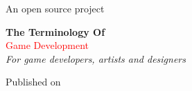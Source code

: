 \begin{titlepage} %

	\raggedleft %
	
	\vspace*{\baselineskip} %
	
	
	{\Large An open source project}
	
	\vspace*{0.167\textheight} %
	
	
	\textbf{\LARGE The Terminology Of}\\[\baselineskip]
	
	{\textcolor{Red}{\Huge Game Development}}\\[\baselineskip]
	
	{\Large \textit{For game developers, artists and designers}}
	
	\vfill
	
	
	{\large Published on ~~\plogo} %
	
	\vspace*{3\baselineskip} %

\end{titlepage}